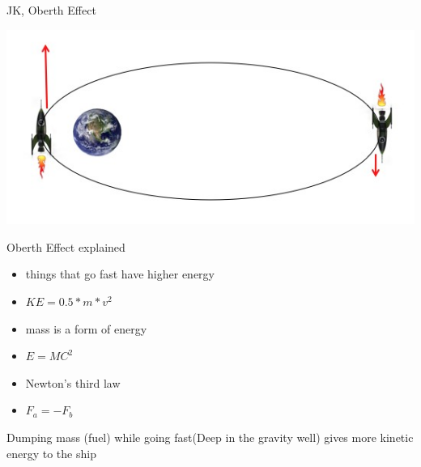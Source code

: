 \begin{frame}[t]{JK, Oberth Effect}
    \begin{block}{}
        \includegraphics[width=\textwidth]{images/obert_effect}
    \end{block}
\end{frame}
\begin{frame}[t]{Oberth Effect explained}
    \begin{block}{}
        \begin{itemize}
            \item things that go fast have higher energy
            \item $KE = 0.5 * m * v^2$
        \end{itemize}
    \end{block}
    \begin{block}{}
        \begin{itemize}
            \item mass is a form of energy
            \item $E = MC^2$
        \end{itemize}
    \end{block}
    \begin{block}{}
        \begin{itemize}
            \item Newton's third law
            \item $F_a = -F_b$
        \end{itemize}
    \end{block}
    \begin{block}{}
        Dumping mass (fuel) while going fast(Deep in the gravity well) gives more kinetic energy to the ship
    \end{block}
\end{frame}
